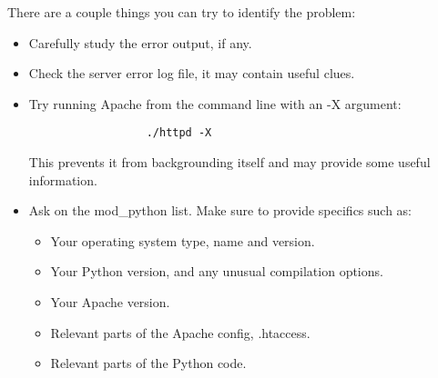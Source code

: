 There are a couple things you can try to identify the problem: 

\begin{itemize}

\item Carefully study the error output, if any. 

\item Check the server error log file, it may contain useful clues. 

\item Try running Apache from the command line with an -X argument: 
\begin{verbatim}
                  ./httpd -X
\end{verbatim}
This prevents it from backgrounding itself and may provide some useful information. 

\item
Ask on the mod_python list. Make sure to provide specifics such as:

\begin{itemize}

\item Your operating system type, name and version.
\item Your Python version, and any unusual compilation options.
\item Your Apache version.
\item Relevant parts of the Apache config, .htaccess.
\item Relevant parts of the Python code.

\end{itemize}

\end{itemize}
